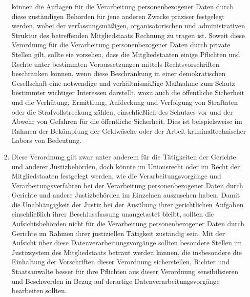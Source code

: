 \begin{enumerate}
    können die Auflagen für die Verarbeitung personenbezogener Daten durch diese zuständigen Behörden für jene anderen
    Zwecke präziser festgelegt werden, wobei der verfassungsmäßigen, organisatorischen und administrativen Struktur des
    betreffenden Mitgliedstaats Rechnung zu tragen ist. Soweit diese Verordnung für die Verarbeitung personenbezogener
    Daten durch private Stellen gilt, sollte sie vorsehen, dass die Mitgliedstaaten einige Pflichten und Rechte unter
    bestimmten Voraussetzungen mittels Rechtsvorschriften beschränken können, wenn diese Beschränkung in einer
    demokratischen Gesellschaft eine notwendige und verhältnismäßige Maßnahme zum Schutz bestimmter wichtiger
    Interessen darstellt, wozu auch die öffentliche Sicherheit und die Verhütung, Ermittlung, Aufdeckung und Verfolgung
    von Straftaten oder die Strafvollstreckung zählen, einschließlich des Schutzes vor und der Abwehr von Gefahren für
    die öffentliche Sicherheit. Dies ist beispielsweise im Rahmen der Bekämpfung der Geldwäsche oder der Arbeit
    kriminaltechnischer Labors von Bedeutung.%
   \label{itm:eg-19}
   

   \item Diese Verordnung gilt zwar unter anderem für die Tätigkeiten der Gerichte und anderer Justizbehörden, doch
    könnte im Unionsrecht oder im Recht der Mitgliedstaaten festgelegt werden, wie die Verarbeitungsvorgänge und
    Verarbeitungsverfahren bei der Verarbeitung personenbezogener Daten durch Gerichte und andere Justizbehörden im
    Einzelnen auszusehen haben. Damit die Unabhängigkeit der Justiz bei der Ausübung ihrer gerichtlichen Aufgaben
    einschließlich ihrer Beschlussfassung unangetastet bleibt, sollten die Aufsichtsbehörden nicht für die Verarbeitung
    personenbezogener Daten durch Gerichte im Rahmen ihrer justiziellen Tätigkeit zuständig sein. Mit der Aufsicht über
    diese Datenverarbeitungsvorgänge sollten besondere Stellen im Justizsystem des Mitgliedstaats betraut werden
    können, die insbesondere die Einhaltung der Vorschriften dieser Verordnung sicherstellen, Richter und Staatsanwälte
    besser für ihre Pflichten aus dieser Verordnung sensibilisieren und Beschwerden in Bezug auf derartige
    Datenverarbeitungsvorgänge bearbeiten sollten.%
   \label{itm:eg-20}
   


\end{enumerate}
